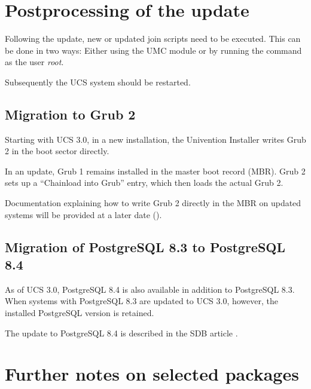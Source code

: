\chapter{Postprocessing of the update}
Following the update, new or updated join scripts need to be executed.
This can be done in two ways: Either using the UMC module 
 or by running the command
 as the user \emph{root}.

Subsequently the UCS system should be restarted.

\section{Migration to Grub 2}
Starting with UCS 3.0, in a new installation, the Univention Installer writes Grub 2 in the
boot sector directly.

In an update, Grub 1 remains installed in the master boot record
(MBR). Grub 2 sets up a ``Chainload into Grub'' entry, which then
loads the actual Grub 2.

Documentation explaining how to write Grub 2 directly in the MBR on
updated systems will be provided at a later date ().

\section{Migration of PostgreSQL 8.3 to PostgreSQL 8.4}
As of UCS 3.0, PostgreSQL 8.4 is also available in addition to
PostgreSQL 8.3. When systems with PostgreSQL 8.3 are updated to UCS
3.0, however, the installed PostgreSQL version is retained.

The update to PostgreSQL 8.4 is described in the SDB
article .

%

\chapter{Further notes on selected packages}

